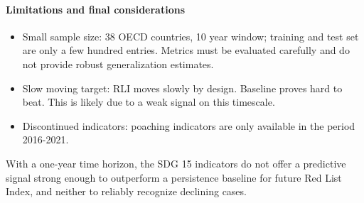 \paragraph{Limitations and final considerations}
\begin{itemize}
    \item Small sample size: 38 OECD countries, 10 year window; training and test set are only a few hundred entries. Metrics must be evaluated carefully and do not provide robust generalization estimates.
    \item Slow moving target: RLI moves slowly by design. Baseline proves hard to beat. This is likely due to a weak signal on this timescale.
    \item Discontinued indicators: poaching indicators are only available in the period 2016-2021.
\end{itemize}
With a one-year time horizon, the SDG 15 indicators do not offer a predictive signal strong enough to outperform a persistence baseline for future Red List Index, and neither to reliably recognize declining cases.